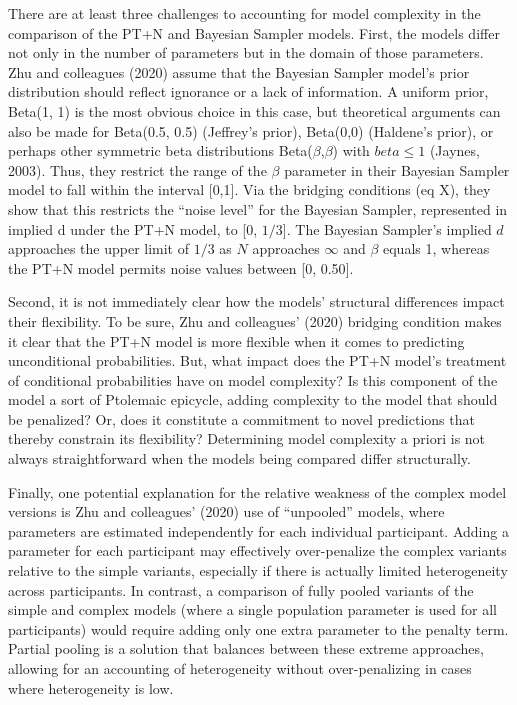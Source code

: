 \documentclass[
  english,
  man,floatsintext]{apa6}
\begin{document}
There are at least three challenges to accounting for model complexity in the comparison of the PT+N and Bayesian Sampler models. First, the models differ not only in the number of parameters but in the domain of those parameters. Zhu and colleagues (2020) assume that the Bayesian Sampler model's prior distribution should reflect ignorance or a lack of information. A uniform prior, Beta(1, 1) is the most obvious choice in this case, but theoretical arguments can also be made for Beta(0.5, 0.5) (Jeffrey's prior), Beta(0,0) (Haldene's prior), or perhaps other symmetric beta distributions Beta(\(\beta\),\(\beta\)) with \(beta \leq 1\) (Jaynes, 2003). Thus, they restrict the range of the \(\beta\) parameter in their Bayesian Sampler model to fall within the interval {[}0,1{]}. Via the bridging conditions (eq X), they show that this restricts the ``noise level'' for the Bayesian Sampler, represented in implied d under the PT+N model, to {[}0, \(1/3\){]}. The Bayesian Sampler's implied \(d\) approaches the upper limit of \(1/3\) as \(N\) approaches \(\infty\) and \(\beta\) equals 1, whereas the PT+N model permits noise values between {[}0, 0.50{]}.

Second, it is not immediately clear how the models' structural differences impact their flexibility. To be sure, Zhu and colleagues' (2020) bridging condition makes it clear that the PT+N model is more flexible when it comes to predicting unconditional probabilities. But, what impact does the PT+N model's treatment of conditional probabilities have on model complexity? Is this component of the model a sort of Ptolemaic epicycle, adding complexity to the model that should be penalized? Or, does it constitute a commitment to novel predictions that thereby constrain its flexibility? Determining model complexity a priori is not always straightforward when the models being compared differ structurally.

Finally, one potential explanation for the relative weakness of the complex model versions is Zhu and colleagues' (2020) use of ``unpooled'' models, where parameters are estimated independently for each individual participant. Adding a parameter for each participant may effectively over-penalize the complex variants relative to the simple variants, especially if there is actually limited heterogeneity across participants. In contrast, a comparison of fully pooled variants of the simple and complex models (where a single population parameter is used for all participants) would require adding only one extra parameter to the penalty term. Partial pooling is a solution that balances between these extreme approaches, allowing for an accounting of heterogeneity without over-penalizing in cases where heterogeneity is low.
\end{document}

